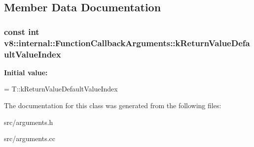 \subsection{Member Data Documentation}
\hypertarget{classv8_1_1internal_1_1_function_callback_arguments_acea5b4f12674359f9dcfd43ab6be7795}{}
\subsubsection[{k\+Return\+Value\+Default\+Value\+Index}]{\setlength{\rightskip}{0pt plus 5cm}const int v8\+::internal\+::\+Function\+Callback\+Arguments\+::k\+Return\+Value\+Default\+Value\+Index\hspace{0.3cm}{\ttfamily [static]}}\label{classv8_1_1internal_1_1_function_callback_arguments_acea5b4f12674359f9dcfd43ab6be7795}
{\bfseries Initial value\+:}
\begin{DoxyCode}
=
      T::kReturnValueDefaultValueIndex
\end{DoxyCode}


The documentation for this class was generated from the following files\+:\begin{DoxyCompactItemize}
\item 
src/arguments.\+h\item 
src/arguments.\+cc\end{DoxyCompactItemize}
